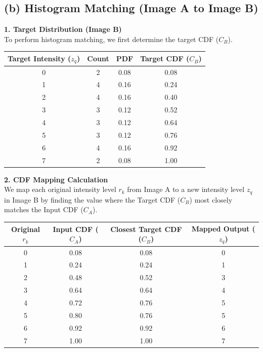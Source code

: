 \documentclass{article}
\begin{document}
\subsection*{(b) Histogram Matching (Image A to Image B)}

\textbf{1. Target Distribution (Image B)}\\
To perform histogram matching, we first determine the target CDF ($C_B$). 

\begin{table}[H]
    \centering
    \renewcommand{\arraystretch}{1.2}
    \begin{tabular}{|c|c|c|c|}
        \hline
        \textbf{Target Intensity ($z_q$)} & \textbf{Count} & \textbf{PDF} & \textbf{Target CDF ($C_B$)} \\
        \hline
        0 & 2 & 0.08 & 0.08 \\
        1 & 4 & 0.16 & 0.24 \\
        2 & 4 & 0.16 & 0.40 \\
        3 & 3 & 0.12 & 0.52 \\
        4 & 3 & 0.12 & 0.64 \\
        5 & 3 & 0.12 & 0.76 \\
        6 & 4 & 0.16 & 0.92 \\
        7 & 2 & 0.08 & 1.00 \\
        \hline
    \end{tabular}
\end{table}

\vspace{1em}
\textbf{2. CDF Mapping Calculation}\\
We map each original intensity level $r_k$ from Image A to a new intensity level $z_q$ in Image B by finding the value where the Target CDF ($C_B$) most closely matches the Input CDF ($C_A$).

\begin{table}[H]
    \centering
    \renewcommand{\arraystretch}{1.2}
    \begin{tabular}{|c|c|c|c|}
        \hline
        \textbf{Original $r_k$} & \textbf{Input CDF ($C_A$)} & \textbf{Closest Target CDF ($C_B$)} & \textbf{Mapped Output ($z_q$)} \\
        \hline
        0 & 0.08 & 0.08 & 0 \\
        1 & 0.24 & 0.24 & 1 \\
        2 & 0.48 & 0.52 & 3 \\
        3 & 0.64 & 0.64 & 4 \\
        4 & 0.72 & 0.76 & 5 \\
        5 & 0.80 & 0.76 & 5 \\
        6 & 0.92 & 0.92 & 6 \\
        7 & 1.00 & 1.00 & 7 \\
        \hline
    \end{tabular}
\end{table}
\end{document}
